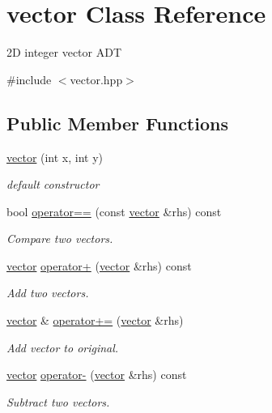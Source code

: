\hypertarget{classvector}{}\section{vector Class Reference}
\label{classvector}


2D integer vector A\+DT  




{\ttfamily \#include $<$vector.\+hpp$>$}

\subsection*{Public Member Functions}
\begin{DoxyCompactItemize}
\item 
\hyperlink{classvector_a7fa147d3199381b9d8b32753bd1a6968}{vector} (int x, int y)
\begin{DoxyCompactList}\small\item\em default constructor \end{DoxyCompactList}\item 
bool \hyperlink{classvector_a3fafaffe7fdcc82cb9bd2cf53d933c1c}{operator==} (const \hyperlink{classvector}{vector} \&rhs) const 
\begin{DoxyCompactList}\small\item\em Compare two vectors. \end{DoxyCompactList}\item 
\hyperlink{classvector}{vector} \hyperlink{classvector_a4ad9ccd38efea1ccba84e7666013532a}{operator+} (\hyperlink{classvector}{vector} \&rhs) const 
\begin{DoxyCompactList}\small\item\em Add two vectors. \end{DoxyCompactList}\item 
\hyperlink{classvector}{vector} \& \hyperlink{classvector_a9972b9662ea23331b1f8faab37e99c45}{operator+=} (\hyperlink{classvector}{vector} \&rhs)
\begin{DoxyCompactList}\small\item\em Add vector to original. \end{DoxyCompactList}\item 
\hyperlink{classvector}{vector} \hyperlink{classvector_a5c5351bb5fa3cfddb1cba6eb500ae782}{operator-\/} (\hyperlink{classvector}{vector} \&rhs) const 
\begin{DoxyCompactList}\small\item\em Subtract two vectors. \end{DoxyCompactList}\item 

\end{DoxyCompactItemize}
